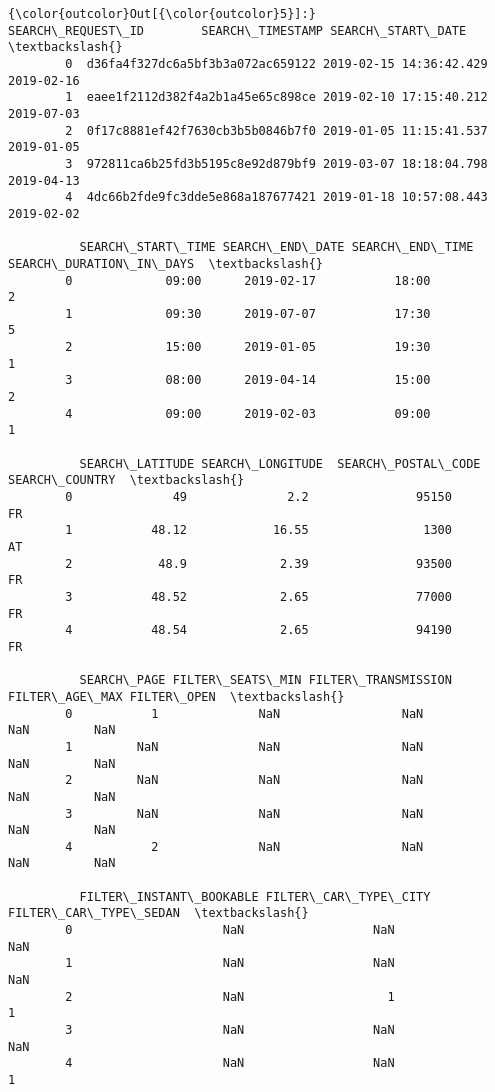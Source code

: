 \documentclass[11pt]{article}
\begin{document}
\begin{Verbatim}[commandchars=\\\{\}]
{\color{outcolor}Out[{\color{outcolor}5}]:}                   SEARCH\_REQUEST\_ID        SEARCH\_TIMESTAMP SEARCH\_START\_DATE  \textbackslash{}
        0  d36fa4f327dc6a5bf3b3a072ac659122 2019-02-15 14:36:42.429        2019-02-16   
        1  eaee1f2112d382f4a2b1a45e65c898ce 2019-02-10 17:15:40.212        2019-07-03   
        2  0f17c8881ef42f7630cb3b5b0846b7f0 2019-01-05 11:15:41.537        2019-01-05   
        3  972811ca6b25fd3b5195c8e92d879bf9 2019-03-07 18:18:04.798        2019-04-13   
        4  4dc66b2fde9fc3dde5e868a187677421 2019-01-18 10:57:08.443        2019-02-02   
        
          SEARCH\_START\_TIME SEARCH\_END\_DATE SEARCH\_END\_TIME  SEARCH\_DURATION\_IN\_DAYS  \textbackslash{}
        0             09:00      2019-02-17           18:00                        2   
        1             09:30      2019-07-07           17:30                        5   
        2             15:00      2019-01-05           19:30                        1   
        3             08:00      2019-04-14           15:00                        2   
        4             09:00      2019-02-03           09:00                        1   
        
          SEARCH\_LATITUDE SEARCH\_LONGITUDE  SEARCH\_POSTAL\_CODE SEARCH\_COUNTRY  \textbackslash{}
        0              49              2.2               95150             FR   
        1           48.12            16.55                1300             AT   
        2            48.9             2.39               93500             FR   
        3           48.52             2.65               77000             FR   
        4           48.54             2.65               94190             FR   
        
          SEARCH\_PAGE FILTER\_SEATS\_MIN FILTER\_TRANSMISSION FILTER\_AGE\_MAX FILTER\_OPEN  \textbackslash{}
        0           1              NaN                 NaN            NaN         NaN   
        1         NaN              NaN                 NaN            NaN         NaN   
        2         NaN              NaN                 NaN            NaN         NaN   
        3         NaN              NaN                 NaN            NaN         NaN   
        4           2              NaN                 NaN            NaN         NaN   
        
          FILTER\_INSTANT\_BOOKABLE FILTER\_CAR\_TYPE\_CITY FILTER\_CAR\_TYPE\_SEDAN  \textbackslash{}
        0                     NaN                  NaN                   NaN   
        1                     NaN                  NaN                   NaN   
        2                     NaN                    1                     1   
        3                     NaN                  NaN                   NaN   
        4                     NaN                  NaN                     1   
        

\end{Verbatim}
\end{document}
